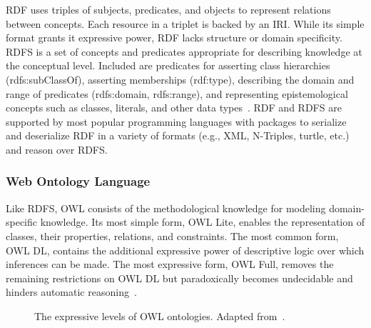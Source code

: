 \ac{RDF} uses triples of subjects, predicates, and objects to represent relations between concepts.
Each resource in a triplet is backed by an \ac{IRI}.
While its simple format grants it expressive power, \ac{RDF} lacks structure or domain specificity.
\ac{RDFS} is a set of concepts and predicates appropriate for describing knowledge at the conceptual level.
Included are predicates for asserting class hierarchies (rdfs:subClassOf), asserting memberships (rdf:type), describing the domain and range of predicates (rdfs:domain, rdfs:range), and representing epistemological concepts such as classes, literals, and other data types~\cite{Beckett2014}.
RDF and RDFS are supported by most popular programming languages with packages to serialize and deserialize RDF in a variety of formats (e.g., \ac{XML}, N-Triples, turtle, etc.) and reason over \ac{RDFS}.

\subsubsection{Web Ontology Language}

Like \ac{RDFS}, \ac{OWL} consists of the methodological knowledge for modeling domain-specific knowledge.
Its most simple form, \ac{OWL} Lite, enables the representation of classes, their properties, relations, and constraints.
The most common form, \ac{OWL} \ac{DL}, contains the additional expressive power of descriptive logic over which inferences can be made.
The most expressive form, \ac{OWL} Full, removes the remaining restrictions on \ac{OWL} \ac{DL} but paradoxically becomes undecidable and hinders automatic reasoning~\cite{Marchetti2008}.

\begin{figure}
    \captionsetup{format=plain}
    \caption[Descriptive Levels of OWL]{The expressive levels of OWL ontologies. Adapted from~\cite{Marchetti2008}.}
    \label{Fig:owl_types}
\end{figure}

